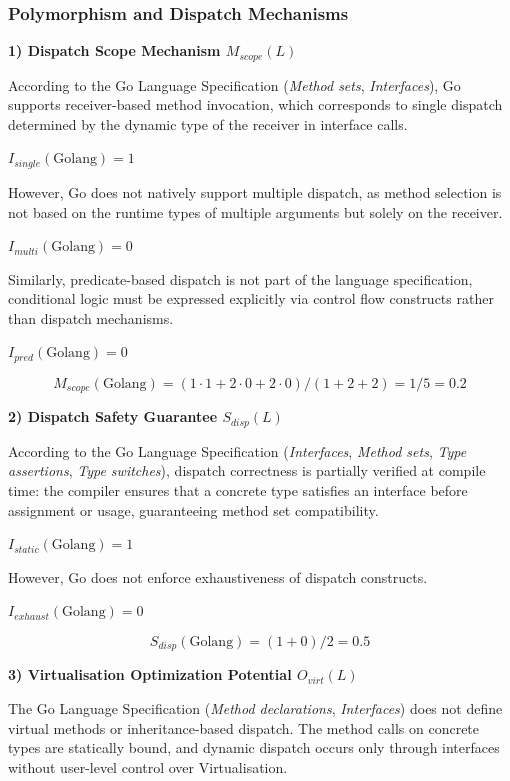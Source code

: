 \subsubsection{Polymorphism and Dispatch Mechanisms}

\textbf{1) Dispatch Scope Mechanism $M_{scope}(L)$}

According to the Go Language Specification (\textit{Method sets}, \textit{Interfaces}), Go supports receiver-based method invocation, which corresponds to single dispatch determined by the dynamic type of the receiver in interface calls.

$I_{single}(\text{Golang})=1$

However, Go does not natively support multiple dispatch, as method selection is not based on the runtime types of multiple arguments but solely on the receiver.

$I_{multi}(\text{Golang})=0$

Similarly, predicate-based dispatch is not part of the language specification, conditional logic must be expressed explicitly via control flow constructs rather than dispatch mechanisms.

$I_{pred}(\text{Golang})=0$

\[
    M_{scope}(\text{Golang}) = (1 \cdot 1 + 2 \cdot 0 + 2 \cdot 0) / (1+2+2) = 1/5 = 0.2
\]

\textbf{2) Dispatch Safety Guarantee $S_{disp}(L)$}

According to the Go Language Specification (\textit{Interfaces}, \textit{Method sets}, \textit{Type assertions}, \textit{Type switches}), dispatch correctness is partially verified at compile time: the compiler ensures that a concrete type satisfies an interface before assignment or usage, guaranteeing method set compatibility.

$I_{static}(\text{Golang})=1$

However, Go does not enforce exhaustiveness of dispatch constructs.

$I_{exhaust}(\text{Golang})=0$

\[
    S_{disp}(\text{Golang}) = (1 + 0)/2 = 0.5
\]

\textbf{3) Virtualisation Optimization Potential $O_{virt}(L)$}

The Go Language Specification (\textit{Method declarations}, \textit{Interfaces}) does not define virtual methods or inheritance-based dispatch. The method calls on concrete types are statically bound, and dynamic dispatch occurs only through interfaces without user-level control over Virtualisation. 

